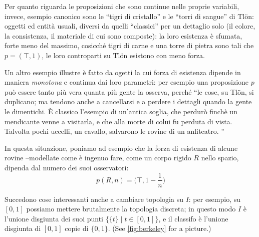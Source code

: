 \begin{example}\label{blu}
	Per quanto riguarda le proposizioni che sono continue nelle proprie variabili, invece, esempio canonico sono le ``tigri di cristallo'' e le ``torri di sangue'' di Tl\"{o}n: oggetti ed entità usuali, diversi da quelli ``classici'' per un dettaglio solo (il colore, la consistenza, il materiale di cui sono composte): la loro esistenza è sfumata, forte meno del massimo, cosicché tigri di carne e una torre di pietra sono tali che $p=(\top,1)$, le loro controparti su Tl\"on esistono con meno forza.

	Un altro esempio illustre è fatto da ogetti la cui forza di esistenza dipende in maniera \emph{monotona} e continua dai loro parametri: per esempio una proposizione $p$ può essere tanto più vera quanta più gente la osserva, perché ``le cose, su Tlön, si duplicano; ma tendono anche a cancellarsi e a  perdere i dettagli quando la gente le dimentichi. È classico l'esempio di  un'antica soglia, che perdurò finchè un mendicante venne a visitarla, e che alla  morte di colui fu perduta di vista. Talvolta pochi uccelli, un cavallo, salvarono le  rovine di un anfiteatro. ''

	In questa situazione, poniamo ad esempio che la forza di esistenza di alcune rovine --modellate come è ingenuo fare, come un corpo rigido $R$ nello spazio, dipenda dal numero dei suoi osservatori:
	\[\textstyle p(R, n) = \big(\top, 1-\frac{1}{n}\big)\]
\end{example}
Succedono cose interessanti anche a cambiare topologia su $I$: per esempio, su $[0,1]$ possiamo mettere brutalmente la topologia discreta; in questo modo $I$ è l'unione disgiunta dei suoi punti $\{ \{t\} \mid t\in [0,1]\}$, e il classifo è l'unione disgiunta di $[0,1]$ copie di $\{0,1\}$. (See \autoref{fig:berkeley} for a picture.)
